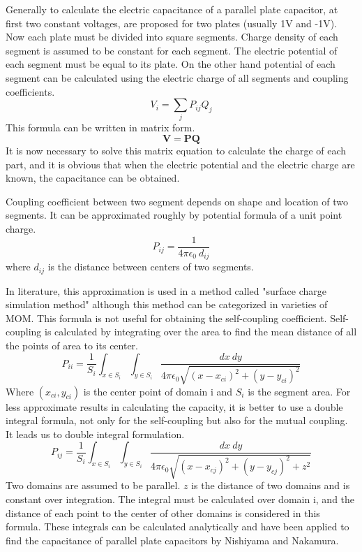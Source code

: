 \documentclass[final,5p,times,twocolumn]{elsarticle}
\begin{document}
Generally to calculate the electric capacitance of a parallel plate capacitor, at first two constant voltages, are proposed for two plates (usually 1V and -1V). Now each plate must be divided into square segments. Charge density of each segment is assumed to be constant for each segment. The electric potential of each segment must be equal to its plate. On the other hand potential of each segment can be calculated using the electric charge of all segments and coupling coefficients.
\begin{equation}
\label{eq1}
V_i = \sum_j P_{ij} Q_j
\end{equation}
This formula can be written in matrix form.
\begin{equation}
\label{eq2}
\mathbf V = \mathbf P \mathbf Q
\end{equation}
It is now necessary to solve this matrix equation to calculate the charge of each part, and it is obvious that when the electric potential and the electric charge are known, the capacitance can be obtained.
 
Coupling coefficient between two segment depends on shape and location of two segments. It can be approximated roughly by potential formula of a unit point charge. 
\begin{equation}
\label{eq3}
P_{ij} = \frac{1}{4 \pi \epsilon_0\  d_{ij}}
\end{equation}
where $d_{ij}$ is the distance between centers of two segments.


In literature, this approximation is used in a method called "surface charge simulation method"\cite {Zhou1993} although this method can be categorized in varieties of MOM. This formula is not useful for obtaining the self-coupling coefficient. Self-coupling is calculated by integrating over the area to find the mean distance of all the points of area to its center.
\begin{equation}
\label{eq4}
P_{ii} = \frac 1 {S_i} \int_{x \in S_i} \int_{y \in S_i} \frac {dx\  dy}{4 \pi \epsilon_0 \sqrt{(x-x_{ci})^2 + (y-y_{ci})^2}}
\end{equation}
Where $(x_{ci}, y_{ci})$ is the center point of domain i and $S_i $ is the segment area.
For less approximate results in calculating the capacity, it is better to use a double integral formula, not only for the self-coupling but also for the mutual coupling. It leads us to double integral formulation.
\begin{equation}
\label{eq5}
P_{ij} = \frac 1 {S_i}\int_{x \in S_i} \int_{y \in S_i} \frac {dx\  dy}{4 \pi \epsilon_0 \sqrt{(x-x_{cj})^2 + (y-y_{cj})^2+ z^2}}
\end{equation}
Two domains are assumed to be parallel. $z$ is the distance of two domains and is constant over integration. The integral must be calculated over domain i, and the distance of each point to the center of other domains is considered in this formula. These integrals can be calculated analytically and have been applied to find the capacitance of parallel plate capacitors by Nishiyama and Nakamura\cite {Nishiyama1994}.
\end{document}
